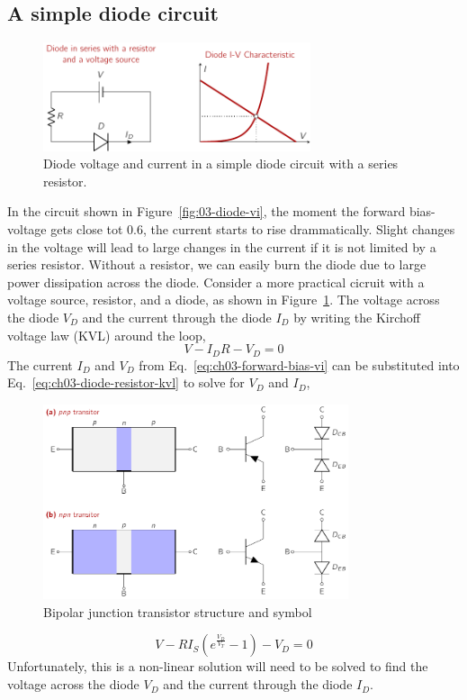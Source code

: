 \subsection{A simple diode circuit}
\begin{figure}[b]
    \centering
    \includegraphics[width=0.7\textwidth]{figure/ch03/fig03-diode-resistor-ckt.pdf}
    \caption{Diode voltage and current in a simple diode circuit with a series resistor.}
    \label{fig:03-diode-resistor-ckt}
\end{figure}
In the circuit shown in Figure~\ref{fig:03-diode-vi}, the moment the forward bias-voltage gets close tot 0.6, the current starts to rise drammatically. Slight changes in the voltage will lead to large changes in the current if it is not limited by a series resistor. Without a resistor, we can easily burn the diode due to large power dissipation across the diode. Consider a more practical cicruit with a voltage source, resistor, and a diode, as shown in Figure~\ref{fig:03-diode-resistor-ckt}. The voltage across the diode $V_D$ and the current through the diode $I_D$ by writing the Kirchoff voltage law (KVL) around the loop,
\begin{equation}
    V - I_D R - V_D = 0
    \label{eq:ch03-diode-resistor-kvl}
\end{equation}
The current $I_D$ and $V_D$ from Eq.~\ref{eq:ch03-forward-bias-vi} can be substituted into Eq.~\ref{eq:ch03-diode-resistor-kvl} to solve for $V_D$ and $I_D$,
\begin{figure}[t]
    \centering
    \includegraphics[width=0.8\textwidth]{figure/ch03/fig03-bjt-struct.pdf}
    \caption{Bipolar junction transistor structure and symbol}
    \label{fig:03-04}
\end{figure}
\begin{equation}
    V - R I_S \left( e^{\frac{V_D}{V_T}} - 1 \right) - V_D = 0
    \label{eq:ch03-diode-resistor-vd-id}
\end{equation}
Unfortunately, this is a non-linear solution will need to be solved to find the voltage across the diode $V_D$ and the current through the diode $I_D$. 

